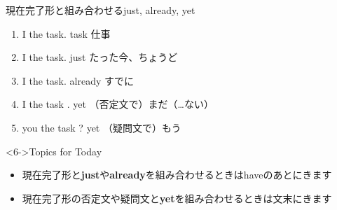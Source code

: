 \documentclass[aspectratio=169,xcolor={dvipsnames,table}]{beamer}
\begin{document}
\begin{frame}[plain]{現在完了形と組み合わせるjust, already, yet}
\begin{enumerate}
 \item<1-> I  the task.%
\hfill{}{\scriptsize task  仕事}
 \item<2-> I    the task.%
\hfill{}{\scriptsize just  たった今、ちょうど}
 \item<3-> I    the task.%
\hfill{}{\scriptsize already  すでに}
 \item<4-> I    the task .%
\hfill{}{\scriptsize yet  （否定文で）まだ（\ldots ない）}
 \item<5->  you  the task ?%
\hfill{}{\scriptsize yet  （疑問文で）もう}
\end{enumerate}

\bigskip

 \begin{exampleblock}<6->{Topics for Today}
\small
\begin{itemize}[square]\small
 \item 現在完了形と\textbf{just}や\textbf{already}を組み合わせるときはhaveのあとにきます
 \item 現在完了形の否定文や疑問文と\textbf{yet}を組み合わせるときは文末にきます
\end{itemize}
      \end{exampleblock}
\end{frame}
\end{document}
